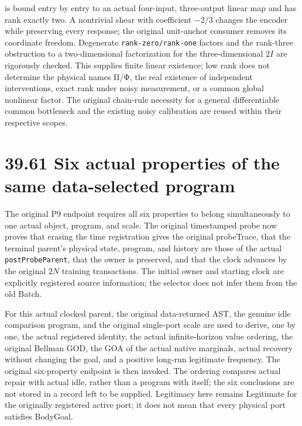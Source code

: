 \documentclass[
  english,
  11pt,
  oneside]{book}
\begin{document}
is bound entry by entry to an actual four-input, three-output linear map and has rank exactly two. A nontrivial shear with coefficient \(-2/3\) changes the encoder while preserving every response; the original unit-anchor consumer removes its coordinate freedom. Degenerate \nolinkurl{rank-zero/rank-one} factors and the rank-three obstruction to a two-dimensional factorization for the three-dimensional \(2I\) are rigorously checked. This supplies finite linear existence; low rank does not determine the physical names Π/Φ, the real existence of independent interventions, exact rank under noisy measurement, or a common global nonlinear factor. The original chain-rule necessity for a general differentiable common bottleneck and the existing noisy calibration are reused within their respective scopes.

\section{39.61 Six actual properties of the same data-selected program}\label{six-actual-properties-of-the-same-data-selected-program}

The original P9 endpoint requires all six properties to belong simultaneously to one actual object, program, and scale. The original timestamped probe now proves that erasing the time registration gives the original probeTrace, that the terminal parent's physical state, program, and history are those of the actual \nolinkurl{postProbeParent}, that the owner is preserved, and that the clock advances by the original \(2N\) training transactions. The initial owner and starting clock are explicitly registered source information; the selector does not infer them from the old Batch.

For this actual clocked parent, the original data-returned AST, the genuine idle comparison program, and the original single-port scale are used to derive, one by one, the actual registered identity, the actual infinite-horizon value ordering, the original Bellman GOD, the GOA of the actual native marginals, actual recovery without changing the goal, and a positive long-run legitimate frequency. The original six-property endpoint is then invoked. The ordering compares actual repair with actual idle, rather than a program with itself; the six conclusions are not stored in a record left to be supplied. Legitimacy here remains Legitimate for the originally registered active port; it does not mean that every physical port satisfies BodyGoal.
\end{document}
